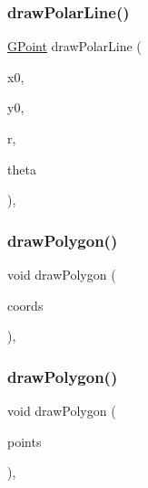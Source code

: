 \subsubsection{\texorpdfstring{draw\+Polar\+Line()}{drawPolarLine()}\hspace{0.1cm}{\footnotesize\ttfamily [2/2]}}
{\footnotesize\ttfamily \mbox{\hyperlink{classGPoint}{G\+Point}} draw\+Polar\+Line (\begin{DoxyParamCaption}\item[{double}]{x0,  }\item[{double}]{y0,  }\item[{double}]{r,  }\item[{double}]{theta }\end{DoxyParamCaption})\hspace{0.3cm}{\ttfamily [virtual]}, {\ttfamily [inherited]}}

\mbox{\label{classGDrawingSurface_afddec0a905108d8a8d6809a157f26776}} 
\subsubsection{\texorpdfstring{draw\+Polygon()}{drawPolygon()}\hspace{0.1cm}{\footnotesize\ttfamily [1/2]}}
{\footnotesize\ttfamily void draw\+Polygon (\begin{DoxyParamCaption}\item[{std\+::initializer\+\_\+list$<$ double $>$}]{coords }\end{DoxyParamCaption})\hspace{0.3cm}{\ttfamily [virtual]}, {\ttfamily [inherited]}}

\mbox{\label{classGDrawingSurface_a021ee881e0d154dc4dd059698742889c}} 
\subsubsection{\texorpdfstring{draw\+Polygon()}{drawPolygon()}\hspace{0.1cm}{\footnotesize\ttfamily [2/2]}}
{\footnotesize\ttfamily void draw\+Polygon (\begin{DoxyParamCaption}\item[{std\+::initializer\+\_\+list$<$ \mbox{\hyperlink{classGPoint}{G\+Point}} $>$}]{points }\end{DoxyParamCaption})\hspace{0.3cm}{\ttfamily [virtual]}, {\ttfamily [inherited]}}

